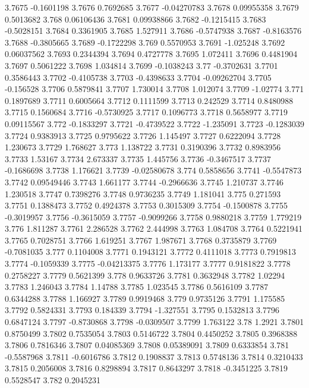 3.7675  -0.1601198
3.7676  0.7692685
3.7677  -0.04270783
3.7678  0.09955358
3.7679  0.5013682
3.768  0.06106436
3.7681  0.09938866
3.7682  -0.1215415
3.7683  -0.5028151
3.7684  0.3361905
3.7685  1.527911
3.7686  -0.5747938
3.7687  -0.8163576
3.7688  -0.3805665
3.7689  -0.1722298
3.769  0.5570953
3.7691  -1.025248
3.7692  0.06037562
3.7693  0.2344394
3.7694  0.4727778
3.7695  1.072411
3.7696  0.4481904
3.7697  0.5061222
3.7698  1.034814
3.7699  -0.1038243
3.77  -0.3702631
3.7701  0.3586443
3.7702  -0.4105738
3.7703  -0.4398633
3.7704  -0.09262704
3.7705  -0.156528
3.7706  0.5879841
3.7707  1.730014
3.7708  1.012074
3.7709  -1.02774
3.771  0.1897689
3.7711  0.6005664
3.7712  0.1111599
3.7713  0.242529
3.7714  0.8480988
3.7715  0.1560684
3.7716  -0.5730925
3.7717  0.1096773
3.7718  0.5658977
3.7719  0.09115567
3.772  -0.1833297
3.7721  -0.4739522
3.7722  -1.235091
3.7723  -0.1283039
3.7724  0.9383913
3.7725  0.9795622
3.7726  1.145497
3.7727  0.6222094
3.7728  1.230673
3.7729  1.768627
3.773  1.138722
3.7731  0.3190396
3.7732  0.8983956
3.7733  1.53167
3.7734  2.673337
3.7735  1.445756
3.7736  -0.3467517
3.7737  -0.1686698
3.7738  1.176621
3.7739  -0.02580678
3.774  0.5858656
3.7741  -0.5547873
3.7742  0.09549446
3.7743  1.661177
3.7744  -0.2966636
3.7745  1.210737
3.7746  1.230518
3.7747  0.7398276
3.7748  0.9736235
3.7749  1.181041
3.775  0.271593
3.7751  0.1388473
3.7752  0.4924378
3.7753  0.3015309
3.7754  -0.1500878
3.7755  -0.3019957
3.7756  -0.3615059
3.7757  -0.9099266
3.7758  0.9880218
3.7759  1.779219
3.776  1.811287
3.7761  2.286528
3.7762  2.444998
3.7763  1.084708
3.7764  0.5221941
3.7765  0.7028751
3.7766  1.619251
3.7767  1.987671
3.7768  0.3735879
3.7769  -0.7081035
3.777  0.1104008
3.7771  0.1943121
3.7772  0.4111018
3.7773  0.7919813
3.7774  -0.1059339
3.7775  -0.04213375
3.7776  1.173177
3.7777  0.9181822
3.7778  0.2758227
3.7779  0.5621399
3.778  0.9633726
3.7781  0.3632948
3.7782  1.02294
3.7783  1.246043
3.7784  1.14788
3.7785  1.023545
3.7786  0.5616109
3.7787  0.6344288
3.7788  1.166927
3.7789  0.9919468
3.779  0.9735126
3.7791  1.175585
3.7792  0.5824331
3.7793  0.184339
3.7794  -1.327551
3.7795  0.1532813
3.7796  0.6847124
3.7797  -0.8730868
3.7798  -0.0309507
3.7799  1.763122
3.78  1.2921
3.7801  0.8750499
3.7802  0.7535054
3.7803  0.5146722
3.7804  0.4450252
3.7805  0.3968388
3.7806  0.7816346
3.7807  0.04085369
3.7808  0.05389091
3.7809  0.6333854
3.781  -0.5587968
3.7811  -0.6016786
3.7812  0.1908837
3.7813  0.5748136
3.7814  0.3210433
3.7815  0.2056008
3.7816  0.8298894
3.7817  0.8643297
3.7818  -0.3451225
3.7819  0.5528547
3.782  0.2045231
